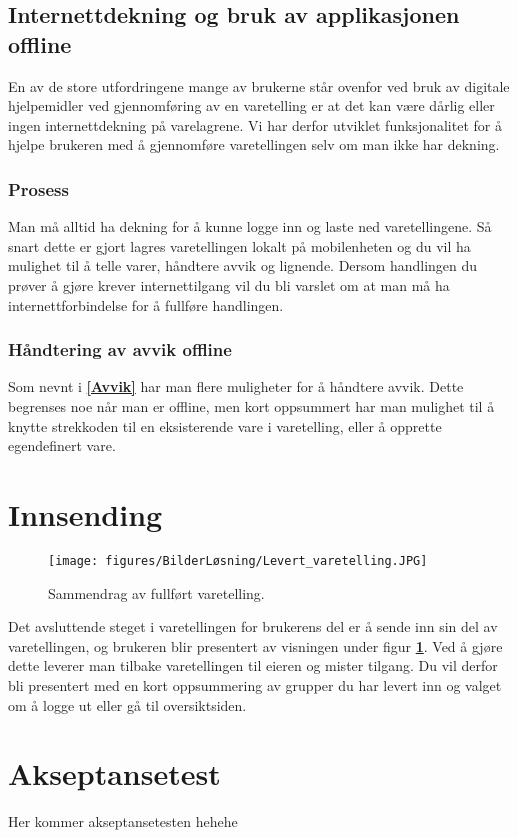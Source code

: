 \subsection{\textbf{Internettdekning og bruk av applikasjonen offline}}
En av de store utfordringene mange av brukerne står ovenfor ved bruk av digitale hjelpemidler ved gjennomføring av en varetelling er at det kan være dårlig eller ingen internettdekning på varelagrene. Vi har derfor utviklet funksjonalitet for å hjelpe brukeren med å gjennomføre varetellingen selv om man ikke har dekning.

\subsubsection{\textbf{Prosess}}
Man må alltid ha dekning for å kunne logge inn og laste ned varetellingene. Så snart dette er gjort lagres varetellingen lokalt på mobilenheten og du vil ha mulighet til å telle varer, håndtere avvik og lignende. Dersom handlingen du prøver å gjøre krever internettilgang vil du bli varslet om at man må ha internettforbindelse for å fullføre handlingen.

\subsubsection{\textbf{Håndtering av avvik offline}}
Som nevnt i \textbf{\ref{Avvik}} har man flere muligheter for å håndtere avvik. Dette begrenses noe når man er offline, men kort oppsummert har man mulighet til å knytte strekkoden til en eksisterende vare i varetelling, eller å opprette egendefinert vare.

\section{\textbf{Innsending}} \label{Innsending}

\begin{figure}[H] 
    \centering
    \texttt{[image: figures/BilderLøsning/Levert\_varetelling.JPG]}
    \caption{Sammendrag av fullført varetelling.}
    \label{Levert_varetelling}
\end{figure}

Det avsluttende steget i varetellingen for brukerens del er å sende inn sin del av varetellingen, og brukeren blir presentert av visningen under figur \textbf{\ref{Levert_varetelling}}. Ved å gjøre dette leverer man tilbake varetellingen til eieren og mister tilgang. Du vil derfor bli presentert med en kort oppsummering av grupper du har levert inn og valget om å logge ut eller gå til oversiktsiden. 

\section{\textbf{Akseptansetest}}

Her kommer akseptansetesten hehehe

